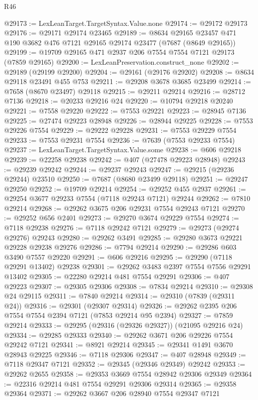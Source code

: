 \begin{lexlean}{R46}
\begin{coremodule}
@29173 := LexLeanTarget.TargetSyntax.Value.none
@29174 := @29172 @29173
@29176 := @29171 @29174 @23465
@29189 := @8634 @29165 @23457 @471 @190 @3682 @476 @7121 @29165 @29174 @23477 (@7687 (@8649 @29165))
@29199 := @19709 @29165 @471 @2937 @206 @7554 @7554 @7121 @29173 (@7859 @29165)
@29200 := LexLeanPreservation.construct_none
@29202 := @29189 (@29199 @29200)
@29204 := @29161 (@29176 @29202)
@29208 := @8634 @29118 @23491 @455 @753
@29211 := @29208 @3678 @3685 @23499
@29214 := @7658 (@8670 @23497) @29118
@29215 := @29211 @29214
@29216 := @28712 @7136
@29218 := @20233 @29216 @24
@29220 := @10794 @29218 @20240
@29221 := @7558 @29220
@29222 := @7553 @29221
@29223 := @28945 @7136
@29225 := @27474 @29223 @28948
@29226 := @28944 @29225
@29228 := @7553 @29226 @7554
@29229 := @29222 @29228
@29231 := @7553 @29229 @7554
@29233 := @7553 @29231 @7554
@29236 := @7639 (@7553 @29233 @7554)
@29237 := LexLeanTarget.TargetSyntax.Value.some
@29238 := @606 @29218
@29239 := @22258 @29238
@29242 := @407 (@27478 @29223 @28948)
@29243 := @29239 @29242
@29244 := @29237 @29243
@29247 := @29215 (@29236 @29244) @23510
@29250 := @7687 (@8680 @23499 @29118)
@29251 := @29247 @29250
@29252 := @19709 @29214
@29254 := @29252 @455 @2937
@29261 := @29254 @3677 @29233 @7554 (@7118 @29243 @7121) @29244
@29262 := @7810 @29214
@29268 := @29262 @3675 @206 @29231 @7554 @29243 @7121
@29270 := @29252 @656 @2401
@29273 := @29270 @3674 @29229 @7554
@29274 := @7118 @29238
@29276 := @7118 @29242 @7121
@29279 := @29273 (@29274 @29276) @29243
@29280 := @29262 @3491
@29285 := @29280 @3673 @29221 @29228 @29238 @29276
@29286 := @7794 @29214
@29290 := @29286 @603 @3490 @7557 @29220
@29291 := @606 @29216
@29295 := @29290 (@7118 @29291 @13402) @29238
@29301 := @29262 @3483 @2397 @7554 @7556 @29291 @13402
@29305 := @22280 @29214 @481 @7554 @29291
@29306 := @407 @29223
@29307 := @29305 @29306
@29308 := @7834 @29214
@29310 := @29308 @24 @29115
@29311 := @7840 @29214
@29314 := @29310 (@7839 (@29311 @24))
@29316 := @29301 (@29307 @29314)
@29326 := @29262 @2395 @206 @7554 @7554 @2394 @7121 (@7853 @29214 @95 @2394)
@29327 := @7859 @29214
@29333 := @29295 (@29316 (@29326 @29327)) (@21095 @29216 @24)
@29334 := @29285 @29333
@29340 := @29262 @3671 @206 @29226 @7554 @29242 @7121
@29341 := @8921 @29214
@29345 := @29341 @1491 @3670 @28943 @29225
@29346 := @7118 @29306
@29347 := @407 @28948
@29349 := @7118 @29347 @7121
@29352 := @29345 (@29346 @29349) @29242
@29353 := @29262 @2655
@29358 := @29353 @3669 @7554 @28942 @29306 @29349
@29364 := @22316 @29214 @481 @7554 @29291 @29306 @29314
@29365 := @29358 @29364
@29371 := @29262 @3667 @206 @28940 @7554 @29347 @7121

\end{coremodule}
\end{lexlean}
